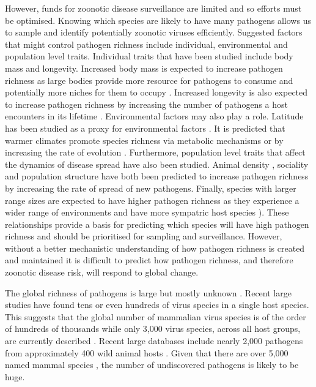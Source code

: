 However, funds for zoonotic disease surveillance are limited and so efforts must be optimised.
Knowing which species are likely to have many pathogens allows us to sample and identify potentially zoonotic viruses efficiently.
Suggested factors that might control pathogen richness include individual, environmental and population level traits.
Individual traits that have been studied include body mass and longevity.
Increased body mass is expected to increase pathogen richness as large bodies provide more resource for pathogens to consume and potentially more niches for them to occupy \cite{kamiya2014determines, arneberg2002host, poulin1995phylogeny, gomez2015diversity, bordes2008bat}.
Increased longevity is also expected to increase pathogen richness by increasing the number of pathogens a host encounters in its lifetime \cite{nunn2003comparative, ezenwa2006host, luis2013comparison}. 
Environmental factors may also play a role. 
Latitude has been studied as a proxy for environmental factors \cite{poulin2010latitudinal, kamiya2014determines}.
It is predicted that warmer climates promote species richness via metabolic mechanisms or by increasing the rate of evolution \cite{brown2004toward, dunn2010global, rohde1992latitudinal}.
Furthermore, population level traits that affect the dynamics of disease spread have also been studied.
Animal density \cite{kamiya2014determines, nunn2003comparative, arneberg2002host}, sociality \cite{bordes2007rodent, vitone2004body, altizer2003social, ezenwa2006host} and population structure \cite{nunes2006localized, maganga2014bat, gay2014parasite, turmelle2009correlates} have both been predicted to increase pathogen richness by increasing the rate of spread of new pathogens.
Finally, species with larger range sizes are expected to have higher pathogen richness as they experience a wider range of environments and have more sympatric host species \cite{kamiya2014determines, nunn2003comparative}).
These relationships provide a basis for predicting which species will have high pathogen richness and should be prioritised for sampling and surveillance.
However, without a better mechanistic understanding of how pathogen richness is created and maintained it is difficult to predict how pathogen richness, and therefore zoonotic disease risk, will respond to global change.


The global richness of pathogens is large but mostly unknown \cite{poulin2014parasite}.
Recent large studies have found tens \cite{anthony2013strategy} or even hundreds \cite{anthony2015non} of virus species in a single host species.
This suggests that the global number of mammalian virus species is of the order of hundreds of thousands \cite{anthony2013strategy} while only 3,000 virus species, across all host groups, are currently described \cite{ICTV}.
Recent large databases include nearly 2,000 pathogens from approximately 400 wild animal hosts \cite{wardeh2015database}.
Given that there are over 5,000 named mammal species \cite{wilson2005mammal}, the number of undiscovered pathogens is likely to be huge.

